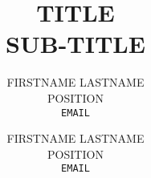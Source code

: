 \documentclass[a4paper,11pt]{article}
\begin{document}
	
\title{TITLE \\ SUB-TITLE}
\author{FIRSTNAME LASTNAME\\POSITION\\\texttt{\small EMAIL} \and FIRSTNAME LASTNAME\\POSITION\\\texttt{\small EMAIL}}
\maketitle

\tableofcontents
\listoffigures
\thispagestyle{empty}
\clearpage

\setcounter{page}{1}
\begin{multicols*}{2}

%
\end{multicols*}
\end{document}
